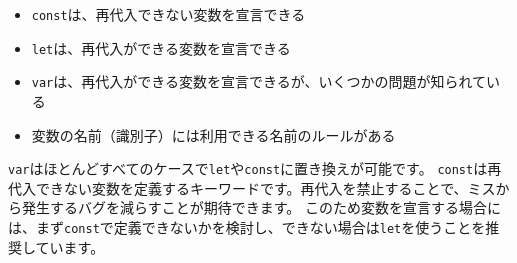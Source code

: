 \begin{itemize}
\item
  \texttt{const}は、再代入できない変数を宣言できる
\item
  \texttt{let}は、再代入ができる変数を宣言できる
\item
  \texttt{var}は、再代入ができる変数を宣言できるが、いくつかの問題が知られている
\item
  変数の名前（識別子）には利用できる名前のルールがある
\end{itemize}

\texttt{var}はほとんどすべてのケースで\texttt{let}や\texttt{const}に置き換えが可能です。
\texttt{const}は再代入できない変数を定義するキーワードです。再代入を禁止することで、ミスから発生するバグを減らすことが期待できます。
このため変数を宣言する場合には、まず\texttt{const}で定義できないかを検討し、できない場合は\texttt{let}を使うことを推奨しています。

